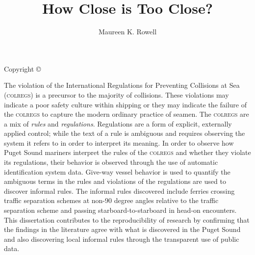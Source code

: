 \documentclass[twoside,symmetric,notoc]{tufte-book}
\title{How Close is Too Close?}
\author{Maureen K. Rowell}
\begin{document}


\pagestyle{empty}
\newpage
\begin{fullwidth}
\begin{center}
\setlength{\parindent}{0pt}
\setlength{\parskip}{\baselineskip}
Copyright \copyright\ \the\year\ \\
\thanklessauthor
\end{center}
\end{fullwidth}


\begin{abstractpage}

\noindent The violation of the International Regulations for Preventing Collisions at Sea (\textsc{colregs}) is a precursor to the majority of collisions. These violations may indicate a poor safety culture within shipping or they may indicate the failure of the \textsc{colregs} to capture the modern ordinary practice of seamen. The \textsc{colregs} are a mix of \textit{rules} and \textit{regulations}. Regulations are a form of explicit, externally applied control; while the text of a rule is ambiguous and requires observing the system it refers to in order to interpret its meaning. In order to observe how Puget Sound mariners interpret the rules of the \textsc{colregs} and whether they violate its regulations, their behavior is observed through the use of  automatic identification system data. Give-way vessel behavior is used to quantify the ambiguous terms in the rules and violations of the regulations are used to discover informal rules. The informal rules discovered include ferries crossing traffic separation schemes at non-90 degree angles relative to the traffic separation scheme and passing starboard-to-starboard in head-on encounters. This dissertation contributes to the reproducibility of research by confirming that the findings in the literature agree with what is discovered in the Puget Sound and also discovering local informal rules through the transparent use of public data.

\end{abstractpage}
\end{document}
